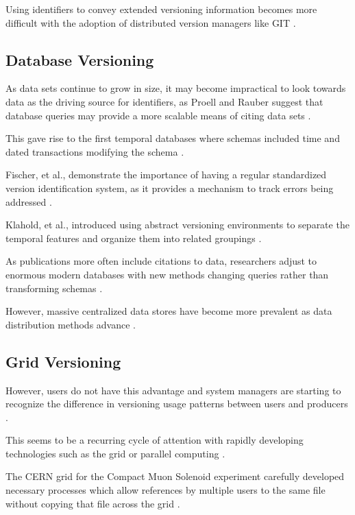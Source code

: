 Using identifiers to convey extended versioning information becomes more difficult with the adoption of distributed version managers like GIT \cite{cederqvist2002version}.

\subsection{Database Versioning}

As data sets continue to grow in size, it may become impractical to look towards data as the driving source for identifiers, as Proell and Rauber suggest that database queries may provide a more scalable means of citing data sets \cite{proellBigData}.

This gave rise to the first temporal databases where schemas included time and dated transactions modifying the schema \cite{roddick1996model}.

Fischer, et al., demonstrate the importance of having a regular standardized version identification system, as it provides a mechanism to track errors being addressed \cite{Fischer2003}.

Klahold, et al., introduced using abstract versioning environments to separate the temporal features and organize them into related groupings \cite{Klahold:1986:GMV:645913.671314}.

As publications more often include citations to data, researchers adjust to enormous modern databases with new methods changing queries rather than transforming schemas \cite{Proell2013} \cite{DBLP:conf/data/2013}.

However, massive centralized data stores have become more prevalent as data distribution methods advance  \cite{Vassiliadis1999}.

\subsection{Grid Versioning}

However, users do not have this advantage and system managers are starting to recognize the difference in versioning usage patterns between users and producers \cite{Branco2008}.

This seems to be a recurring cycle of attention with rapidly developing technologies such as the grid or parallel computing \cite{Kovse2003VGridAVS}.

The CERN grid for the Compact Muon Solenoid experiment carefully developed necessary processes which allow references by multiple users to the same file without copying that file across the grid \cite{Holtman:687353}.

